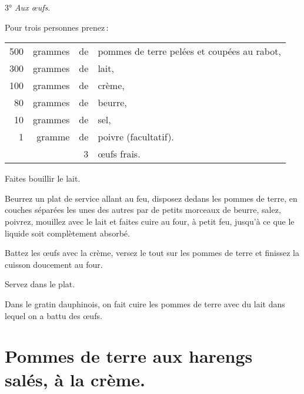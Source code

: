 \medskip

3° \textit{Aux œufs}.

\medskip

Pour trois personnes prenez :

\footnotesize
\begin{longtable}{rrrp{18em}}
    500 & grammes & de & pommes de terre pelées et coupées au rabot,                                      \\
    300 & grammes & de & lait,                                                                            \\
    100 & grammes & de & crème,                                                                           \\
     80 & grammes & de & beurre,                                                                          \\
     10 & grammes & de & sel,                                                                             \\
      1 & gramme  & de & poivre (facultatif).                                                             \\
        &         &  3 & œufs frais.                                                                      \\
\end{longtable}
\normalsize

Faites bouillir le lait.

Beurrez un plat de service allant au feu, disposez dedans les pommes de terre,
en couches séparées les unes des autres par de petits morceaux de beurre,
salez, poivrez, mouillez avec le lait et faites cuire au four, à petit feu,
jusqu'à ce que le liquide soit complètement absorbé.

Battez les œufs avec la crème, versez le tout sur les pommes de terre et
finissez la cuisson doucement au four.

Servez dans le plat.

\sk

Dans le gratin dauphinois, on fait cuire les pommes de terre avec du lait dans
lequel on a battu des œufs.

\section*{\centering Pommes de terre aux harengs salés, à la crème.}
{}

